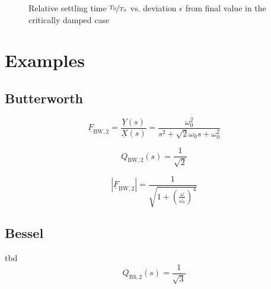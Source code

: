 \documentclass{article}[11pt]
\begin{document}
\begin{figure}[H]
  \centering
  \caption{Relative settling time $\nicefrac{T_{\mathrm{S}}}{T_{\mathrm{0}}}$
    vs. deviation $\epsilon$ from final value in the critically damped case}
  \label{fig:settling-crit-damped}
\end{figure}

\section{Examples}\label{sec:examples}

\subsection{Butterworth}\label{subsec:examples:butterworth}

\begin{equation}
\underline{F}_{\mathrm{BW,2}} = \frac{\underline{Y}(s)}{\underline{X}(s)} 
                 = \frac{\omega_0^2}{s^2 + \sqrt{2} \omega_0 s + \omega_0^2 }
\end{equation}



\begin{equation}
Q_{\mathrm{BW,2}}(s) = \frac{1}{\sqrt{2}}
\end{equation}

\begin{equation}
\left|\underline{F}_{\mathrm{BW,2}}\right|
                 = \frac{1}{\sqrt{1+\left(\frac{\omega}{\omega_0}\right)^4}}
\end{equation}

\subsection{Bessel}
tbd
\begin{equation}
Q_{\mathrm{BS,2}}(s) = \frac{1}{\sqrt{3}}
\end{equation}
\end{document}
